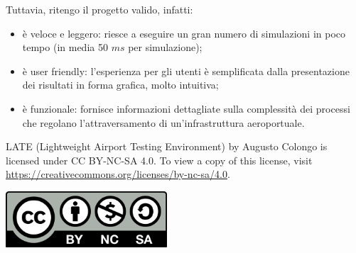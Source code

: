 \documentclass[a4paper, 12pt]{article}
\begin{document}
Tuttavia, ritengo il progetto valido, infatti: 
\begin{itemize}
\item è veloce e leggero: riesce a eseguire un gran numero di simulazioni in poco tempo (in media 50 $ms$ per simulazione);

\item è user friendly: l’esperienza per gli utenti è semplificata dalla presentazione dei risultati in forma grafica, molto intuitiva;

\item è funzionale: fornisce informazioni dettagliate sulla complessità dei processi che regolano l’attraversamento di un’infrastruttura aeroportuale.  
\end{itemize}
\newpage



\newpage
\vspace*{\fill}
LATE (Lightweight Airport Testing Environment) by Augusto Colongo is licensed under CC BY-NC-SA 4.0. To view a copy of this license, visit \url{https://creativecommons.org/licenses/by-nc-sa/4.0}.

\begin{center}
 \includegraphics[width=0.45\textwidth]{resources/images/CC-BY-NC-SA_icon.png}
\end{center}
\end{document}
